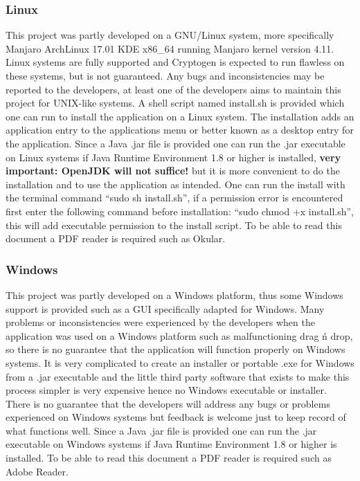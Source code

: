 \documentclass[11pt]{article}
\begin{document}
	\subsubsection{Linux}
	This project was partly developed on a GNU/Linux system, more specifically Manjaro ArchLinux 17.01 KDE x86\_64 running Manjaro kernel version 4.11. Linux systems are fully supported and Cryptogen is expected to run flawless on these systems, but is not guaranteed. Any bugs and inconsistencies may be reported to the developers, at least one of the developers aims to maintain this project for UNIX-like systems. A shell script named install.sh is provided which one can run to install the application on a Linux system. The installation adds an application entry to the applications menu or better known as a desktop entry for the application. Since a Java .jar file is provided one can run the .jar executable on Linux systems if Java Runtime Environment 1.8 or higher is installed, \textbf{very important: OpenJDK will not suffice!} but it is more convenient to do the installation and to use the application as intended. One can run the install with the terminal command ``sudo sh install.sh'', if a permission error is encountered first enter the following command before installation: ``sudo chmod +x install.sh'', this will add executable permission to the install script. To be able to read this document a PDF reader is required such as Okular.

	\subsubsection{Windows}
	This project was partly developed on a Windows platform, thus some Windows support is provided such as a GUI specifically adapted for Windows. Many problems or inconsistencies were experienced by the developers when the application was used on a Windows platform such as malfunctioning drag \'n drop, so there is no guarantee that the application will function properly on Windows systems. It is very complicated to create an installer or portable .exe for Windows from a .jar executable and the little third party software that exists to make this process simpler is very expensive hence no Windows executable or installer. There is no guarantee that the developers will address any bugs or problems experienced on Windows systems but feedback is welcome just to keep record of what functions well. Since a Java .jar file is provided one can run the .jar executable on Windows systems if Java Runtime Environment 1.8 or higher is installed. To be able to read this document a PDF reader is required such as Adobe Reader.
\end{document}
